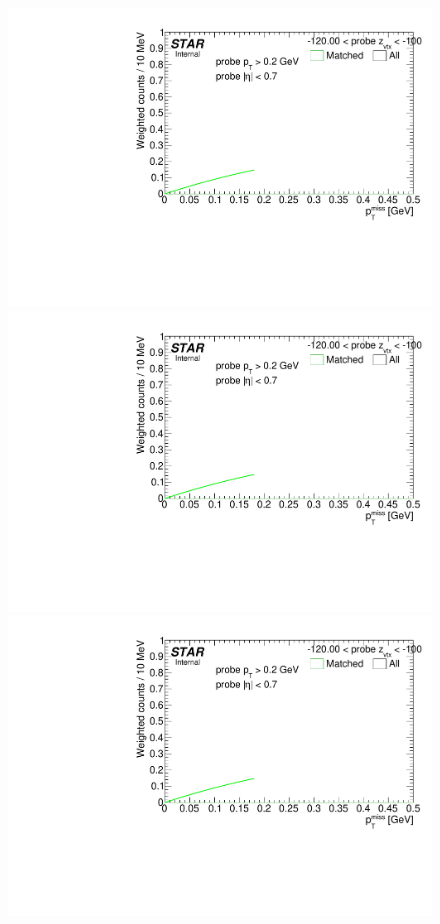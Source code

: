 \begin{figure}[h!]
{}~
\parbox{0.24\textwidth}{
  \centering
  \includegraphics[width=\linewidth,page=3]{graphics/correctionsToEff/TOF_tagAndProbe/Fitting_effVsZVtx_mc.CPT2.pdf}\\
  \includegraphics[width=\linewidth,page=5]{graphics/correctionsToEff/TOF_tagAndProbe/Fitting_effVsZVtx_mc.CPT2.pdf}\\
  \includegraphics[width=\linewidth,page=7]{graphics/correctionsToEff/TOF_tagAndProbe/Fitting_effVsZVtx_mc.CPT2.pdf}\\
}
\end{figure}

